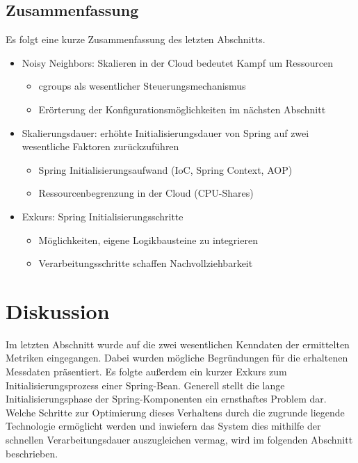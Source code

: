 \begin{minipage}{\textwidth}
\subsection{Zusammenfassung}

Es folgt eine kurze Zusammenfassung des letzten Abschnitts.

\begin{itemize}
	\item Noisy Neighbors: Skalieren in der Cloud bedeutet Kampf um Ressourcen
	\begin{itemize}
		\item cgroups als wesentlicher Steuerungsmechanismus
		\item Erörterung der Konfigurationsmöglichkeiten im nächsten Abschnitt
	\end{itemize}
	\item Skalierungsdauer: erhöhte Initialisierungsdauer von Spring auf zwei wesentliche Faktoren zurückzuführen
	\begin{itemize}
		\item Spring Initialisierungsaufwand (IoC, Spring Context, AOP)
		\item Ressourcenbegrenzung in der Cloud (CPU-Shares)
	\end{itemize}
	\item Exkurs: Spring Initialisierungsschritte
	\begin{itemize}
		\item Möglichkeiten, eigene Logikbausteine zu integrieren
		\item Verarbeitungsschritte schaffen Nachvollziehbarkeit
	\end{itemize}
\end{itemize}
\end{minipage}

\section{Diskussion}
\label{sec:diskussion}
Im letzten Abschnitt wurde auf die zwei wesentlichen Kenndaten der ermittelten Metriken eingegangen. Dabei wurden mögliche Begründungen für die erhaltenen Messdaten präsentiert. Es folgte außerdem ein kurzer Exkurs zum Initialisierungsprozess einer Spring-Bean. Generell stellt die lange Initialisierungsphase der Spring-Komponenten ein ernsthaftes Problem dar. Welche Schritte zur Optimierung dieses Verhaltens durch die zugrunde liegende Technologie ermöglicht werden und inwiefern das System dies mithilfe der schnellen Verarbeitungsdauer auszugleichen vermag, wird im folgenden Abschnitt beschrieben. 

